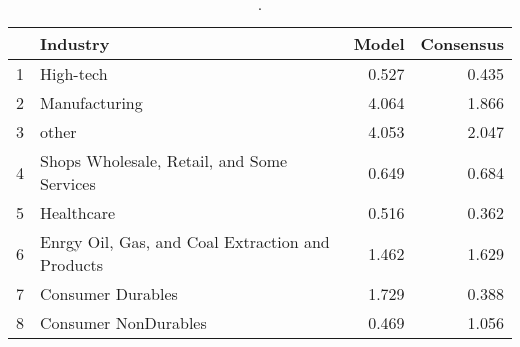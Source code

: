 \begin{table}[ht]
\centering
\begin{tabular}{rlrr}
  \hline
 & Industry & Model & Consensus \\ 
  \hline
1 & High-tech & 0.527 & 0.435 \\ 
  2 & Manufacturing & 4.064 & 1.866 \\ 
  3 & other & 4.053 & 2.047 \\ 
  4 & Shops Wholesale, Retail, and Some Services & 0.649 & 0.684 \\ 
  5 & Healthcare & 0.516 & 0.362 \\ 
  6 & Enrgy Oil, Gas, and Coal Extraction and Products & 1.462 & 1.629 \\ 
  7 & Consumer Durables & 1.729 & 0.388 \\ 
  8 & Consumer NonDurables & 0.469 & 1.056 \\ 
   \hline
\end{tabular}
\caption{.} 
\label{spe-by-industry-table-fy1}
\end{table}
